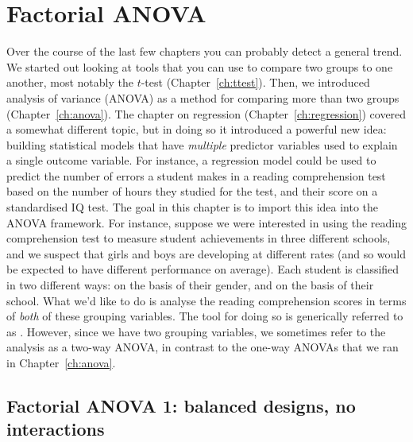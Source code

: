 
\chapter{Factorial ANOVA \label{ch:anova2}}

Over the course of the last few chapters you can probably detect a general trend. We started out looking at tools that you can use to compare two groups to one another, most notably the $t$-test (Chapter~\ref{ch:ttest}). Then, we introduced analysis of variance (ANOVA) as a method for comparing more than two groups (Chapter~\ref{ch:anova}). The chapter on regression (Chapter~\ref{ch:regression}) covered a somewhat different topic, but in doing so it introduced a powerful new idea: building statistical models that have {\it multiple} predictor variables used to explain a single outcome variable. For instance, a regression model could be used to predict the number of errors a student makes in a reading comprehension test based on the number of hours they studied for the test, and their score on a standardised IQ test. The goal in this chapter is to import this idea into the ANOVA framework. For instance, suppose we were interested in using the reading comprehension test to measure student achievements in three different schools, and we suspect that girls and boys are developing at different rates (and so would be expected to have different performance on average). Each student is classified in two different ways: on the basis of their gender, and on the basis of their school. What we'd like to do is analyse the reading comprehension scores in terms of {\it both} of these grouping variables. The tool for doing so is generically referred to as . However, since we have two grouping variables, we sometimes refer to the analysis as a two-way ANOVA, in contrast to the one-way ANOVAs that we ran in Chapter~\ref{ch:anova}.

\section{Factorial ANOVA 1: balanced designs, no interactions\label{sec:factorialanovasimple}}


